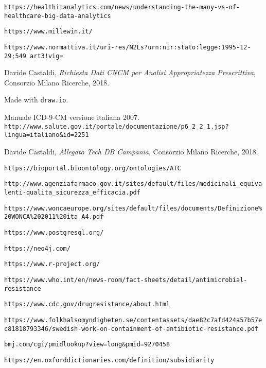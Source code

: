 \begin{thebibliography}{}
	\footnotesize
	
	\texttt{https://healthitanalytics.com/news/understanding-the-many-vs-of-healthcare-big-data-analytics}
	
	\texttt{https://www.millewin.it/}
	
	\texttt{https://www.normattiva.it/uri-res/N2Ls?urn:nir:stato:legge:1995-12-29;549~art3!vig=}
	
	Davide Castaldi, \textit{Richiesta Dati CNCM per Analisi Appropriatezza Prescrittiva}, Consorzio Milano Ricerche, 2018.
	
	Made with \texttt{draw.io}.
	
	Manuale ICD-9-CM versione italiana 2007. \\
	\texttt{http://www.salute.gov.it/portale/documentazione/p6\_2\_2\_1.jsp?lingua=italiano\&id=2251}
	
	Davide Castaldi, \textit{Allegato Tech DB Campania}, Consorzio Milano Ricerche, 2018.
	
	\texttt{https://bioportal.bioontology.org/ontologies/ATC} 
	
	\texttt{http://www.agenziafarmaco.gov.it/sites/default/files/medicinali\_equivalenti-qualita\_sicurezza\_efficacia.pdf}
	
	\texttt{https://www.woncaeurope.org/sites/default/files/documents/Definizione\%20WONCA\%202011\%20ita\_A4.pdf}
	
	\texttt{https://www.postgresql.org/}
	
	\texttt{https://neo4j.com/}
	
	\texttt{https://www.r-project.org/}
	
	\texttt{https://www.who.int/en/news-room/fact-sheets/detail/antimicrobial-resistance}
	
	\texttt{https://www.cdc.gov/drugresistance/about.html}
	
	\texttt{https://www.folkhalsomyndigheten.se/contentassets/dae82c7afd424a57b57ec81818793346/swedish-work-on-containment-of-antibiotic-resistance.pdf}
	
	\texttt{bmj.com/cgi/pmidlookup?view=long\&pmid=9270458}
	
	\texttt{https://en.oxforddictionaries.com/definition/subsidiarity}
	

\end{thebibliography}
